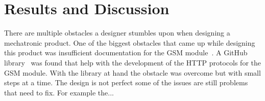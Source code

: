 \section{Results and Discussion}
There are multiple obstacles a designer stumbles upon when designing a mechatronic product.
One of the biggest obstacles that came up while designing this product was insufficient documentation for the GSM module~\cite{SM5100B}.
A GitHub library~\cite{meirm} was found that help with the development of the HTTP protocols for the GSM module. With the library at hand the obstacle was overcome but with small steps at a time.
The design is not perfect some of the issues are still problems that need to fix. For example the... %



